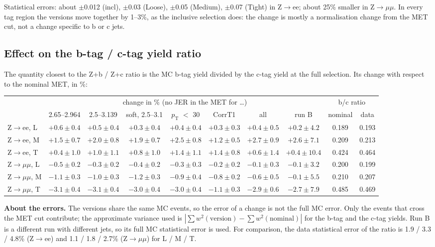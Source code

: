 \documentclass[11pt,a4paper]{article}
\newcommand{\Zee}{Z$\to$ee}
\newcommand{\Zmm}{Z$\to\mu\mu$}
\newcommand{\pt}{$p_\mathrm{T}$}
\begin{document}
Statistical errors: about $\pm$0.012 (incl), $\pm$0.03 (Loose), $\pm$0.05 (Medium), $\pm$0.07 (Tight) in \Zee; about 25\% smaller
in \Zmm. In every tag region the versions move together by 1--3\%, as the inclusive selection does: the change is mostly
a normalisation change from the MET cut, not a change specific to b or c jets.

\subsection{Effect on the b-tag / c-tag yield ratio}
\label{sec:bc}
The quantity closest to the Z+b / Z+c ratio is the MC b-tag yield divided by the c-tag yield at the full selection.
Its change with respect to the nominal MET, in \%:
\begin{center}
\footnotesize
\setlength{\tabcolsep}{2.5pt}
\begin{tabular}{l ccccccc cc}
\toprule
 & \multicolumn{7}{c}{change in \% (no JER in the MET for \ldots)} & \multicolumn{2}{c}{b/c ratio} \\
 & 2.65--2.964 & 2.5--3.139 & soft, 2.5--3.1 & \pt{} $<$ 30 & CorrT1 & all & run B & nominal & data \\
\midrule
\Zee, L & $+0.6\pm0.4$ & $+0.5\pm0.4$ & $+0.3\pm0.4$ & $+0.4\pm0.4$ & $+0.3\pm0.3$ & $+0.4\pm0.5$ & $+0.2\pm4.2$ & 0.189 & 0.193 \\
\Zee, M & $+1.5\pm0.7$ & $+2.0\pm0.8$ & $+1.9\pm0.7$ & $+2.5\pm0.8$ & $+1.2\pm0.5$ & $+2.7\pm0.9$ & $+2.6\pm7.1$ & 0.209 & 0.213 \\
\Zee, T & $+0.4\pm1.0$ & $+1.0\pm1.1$ & $+0.8\pm1.0$ & $+1.4\pm1.1$ & $+1.4\pm0.8$ & $+0.6\pm1.4$ & $+0.4\pm10.4$ & 0.424 & 0.464 \\
\Zmm, L & $-0.5\pm0.2$ & $-0.3\pm0.2$ & $-0.4\pm0.2$ & $-0.3\pm0.3$ & $-0.2\pm0.2$ & $-0.1\pm0.3$ & $-0.1\pm3.2$ & 0.200 & 0.199 \\
\Zmm, M & $-1.1\pm0.3$ & $-1.0\pm0.3$ & $-1.2\pm0.3$ & $-0.9\pm0.4$ & $-0.8\pm0.2$ & $-0.6\pm0.5$ & $-0.1\pm5.5$ & 0.210 & 0.207 \\
\Zmm, T & $-3.1\pm0.4$ & $-3.1\pm0.4$ & $-3.0\pm0.4$ & $-3.0\pm0.4$ & $-1.1\pm0.3$ & $-2.9\pm0.6$ & $-2.7\pm7.9$ & 0.485 & 0.469 \\
\bottomrule
\end{tabular}
\end{center}
\textbf{About the errors.} The versions share the same MC events, so the error of a change is not the full MC error. Only the
events that cross the MET cut contribute; the approximate variance used is $|\sum w^2(\text{version}) - \sum w^2(\text{nominal})|$
for the b-tag and the c-tag yields. Run B is a different run with different jets, so its full MC statistical error is used.
For comparison, the data statistical error of the ratio is 1.9 / 3.3 / 4.8\% (\Zee) and 1.1 / 1.8 / 2.7\% (\Zmm) for L / M / T.
\end{document}
